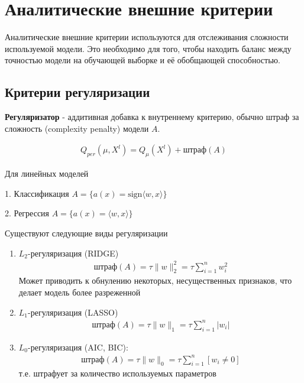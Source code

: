 \section*{Аналитические внешние критерии}

\par Аналитические внешние критерии используются для отслеживания сложности используемой модели. Это необходимо для того, чтобы находить баланс между точностью модели на обучающей выборке и её обобщающей способностью.

\subsection*{Критерии регуляризации}

\par \textbf{Регуляризатор} - аддитивная добавка к внутреннему критерию, обычно штраф за сложность (complexity penalty) модели $A$. 

\begin{align*}
    Q_{per} (\mu, X^l) = Q_{\mu}(X^l) + \text{штраф}(A)
\end{align*}


\par Для линейных моделей

1. Классификация $A = \{a(x) = \text{sign}\langle w, x \rangle\}$

2. Регрессия $A = \{a(x) = \langle w, x \rangle \}$

\par Существуют следующие виды регуляризации

\begin{enumerate}
    \item $L_2$-регуляризация (RIDGE)
        \begin{align*}
            \text{штраф}(A) =  \tau \|w\|_2^2 = \tau \sum\limits_{i = 1}^n w_i^2
        \end{align*}
        Может приводить к обнулению некоторых, несущественных признаков, что делает модель более разреженной
    \item $L_1$-регуляризация (LASSO)
        \begin{align*}
            \text{штраф}(A) = \tau \|w\|_1 = \tau \sum\limits_{i = 1}^n |w_i|
        \end{align*}
    \item $L_0$-регуляризация (AIC, BIC):
        \begin{align*}
            \text{штраф}(A) = \tau\|w\|_0 = \tau\sum\limits_{i = 1}^n [w_i \neq 0]
        \end{align*}
        т.е. штрафует за количество используемых параметров
\end{enumerate}

